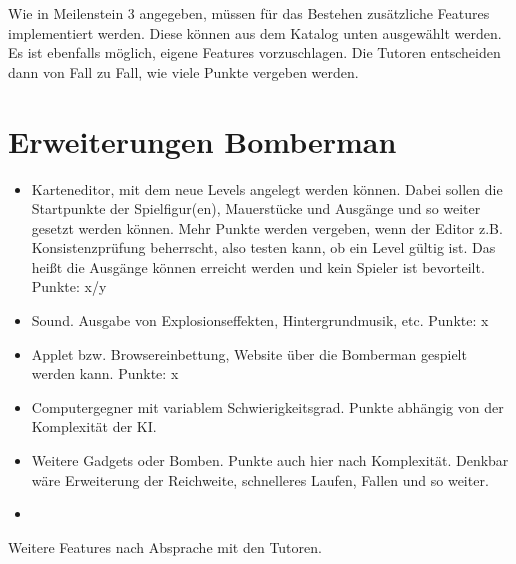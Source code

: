 \documentclass{programmierpraktikum}
\subtitle{Bomberman}
\begin{document}
\maketitle
Wie in Meilenstein 3 angegeben, müssen für das Bestehen zusätzliche Features implementiert werden. Diese können aus dem Katalog unten ausgewählt werden. Es ist ebenfalls möglich, eigene Features vorzuschlagen. Die Tutoren entscheiden dann von Fall zu Fall, wie viele Punkte vergeben werden.
\section{Erweiterungen Bomberman}
\begin{itemize}
  \item Karteneditor, mit dem neue Levels angelegt werden können. Dabei sollen die Startpunkte der Spielfigur(en), Mauerstücke und Ausgänge und so weiter gesetzt werden können. Mehr Punkte werden vergeben, wenn der Editor z.B. Konsistenzprüfung beherrscht, also testen kann, ob ein Level gültig ist. Das heißt die Ausgänge können erreicht werden und kein Spieler ist bevorteilt. Punkte: x/y
  \item Sound. Ausgabe von Explosionseffekten, Hintergrundmusik, etc. Punkte: x
  \item Applet bzw. Browsereinbettung, Website über die Bomberman gespielt werden kann. Punkte: x
  \item Computergegner mit variablem Schwierigkeitsgrad. Punkte abhängig von der Komplexität der KI.
  \item Weitere Gadgets oder Bomben. Punkte auch hier nach Komplexität. Denkbar wäre Erweiterung der Reichweite, schnelleres Laufen, Fallen und so weiter.
  \item 
\end{itemize}
Weitere Features nach Absprache mit den Tutoren.
\end{document}
